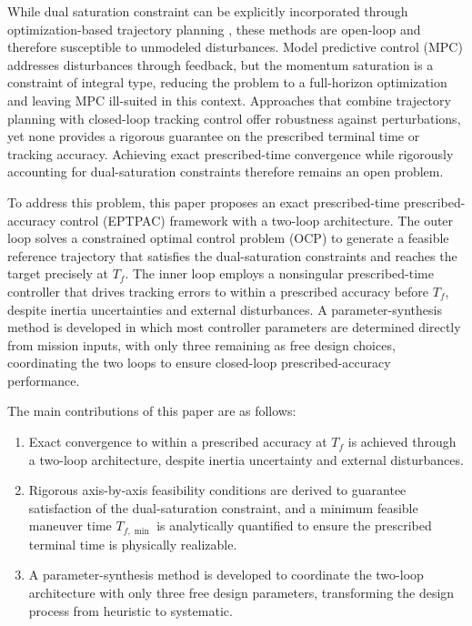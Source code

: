 \documentclass[journal]{new-aiaa}
\begin{document}
While dual saturation constraint can be explicitly incorporated through
optimization-based trajectory planning
\cite{kobayashi_optimal_2017,spiller_inverse_2018,celani_spacecraft_2020,fan_polynomial_2024},
these methods are open-loop and therefore susceptible to unmodeled disturbances.
Model predictive control (MPC)
\cite{mammarella_attitude_2019,yang_attitude_2023}
addresses disturbances through feedback, but the momentum saturation is a constraint of integral type,
reducing the problem to a full-horizon optimization and leaving MPC ill-suited in this context.
Approaches that combine trajectory planning with closed-loop tracking control
\cite{biggs_geometric_2016,yue_systematic_2023}
offer robustness against perturbations, yet none provides a rigorous guarantee on
the prescribed terminal time or tracking accuracy.
Achieving exact prescribed-time convergence while rigorously accounting for
dual-saturation constraints therefore remains an open problem.

To address this problem, this paper proposes an exact prescribed-time
prescribed-accuracy control (EPTPAC) framework with a two-loop architecture.
The outer loop solves a constrained optimal control problem (OCP) to generate
a feasible reference trajectory that satisfies the dual-saturation constraints and reaches the target precisely at $T_f$.
The inner loop employs a nonsingular prescribed-time controller that drives tracking errors
to within a prescribed accuracy before $T_f$, despite inertia uncertainties and external disturbances.
A parameter-synthesis method is developed in which most controller parameters
are determined directly from mission inputs, with only three remaining as free design choices,
coordinating the two loops to ensure closed-loop prescribed-accuracy performance.

The main contributions of this paper are as follows:
\begin{enumerate}
  \item Exact convergence to within a prescribed accuracy at $T_f$ is achieved
  through a two-loop architecture, despite inertia uncertainty and external disturbances.
  \item Rigorous axis-by-axis feasibility conditions are derived to guarantee satisfaction
  of the dual-saturation constraint, and a minimum feasible maneuver time $T_{f,\min}$ is
  analytically quantified to ensure the prescribed terminal time is physically realizable.
  \item A parameter-synthesis method is developed to coordinate the two-loop
  architecture with only three free design parameters, transforming the design
  process from heuristic to systematic.
\end{enumerate}
\end{document}
